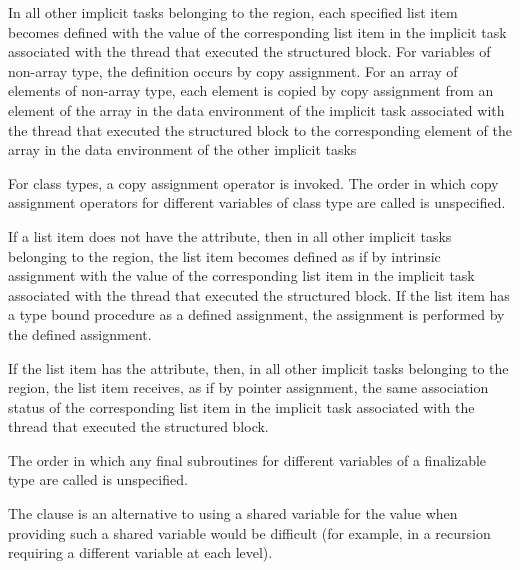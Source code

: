 \begin{ccppspecific}
In all other implicit tasks belonging to the  region, each specified list item
becomes defined with the value of the corresponding list item in the implicit task associated with the
thread that executed the structured block. For variables of non-array type, the definition
occurs by copy assignment. For an array of elements of non-array type, each element is
copied by copy assignment from an element of the array in the data environment of the
implicit task associated with the thread that executed the structured block to the
corresponding element of the array in the data environment of the other implicit tasks
\end{ccppspecific}

\begin{cppspecific}
For class types, a copy assignment operator is invoked. The order in which copy
assignment operators for different variables of class type are called is unspecified.
\end{cppspecific}

\begin{fortranspecific}
If a list item does not have the  attribute, then in all other implicit tasks
belonging to the  region, the list item becomes defined as if by intrinsic
assignment with the value of the corresponding list item in the implicit task associated
with the thread that executed the structured block.  If the list item
has a type bound procedure as a defined assignment, the assignment is
performed by the defined assignment.

If the list item has the  attribute, then, in all other implicit tasks belonging to
the  region, the list item receives, as if by pointer assignment, the same
association status of the corresponding list item in the implicit task associated with the
thread that executed the structured block.

The order in which any final subroutines for different variables of a finalizable type are called is unspecified.
\end{fortranspecific}

\begin{note}
The  clause is an alternative to using a shared variable for the
value when providing such a shared variable would be difficult (for example, in a
recursion requiring a different variable at each level).
\end{note}

